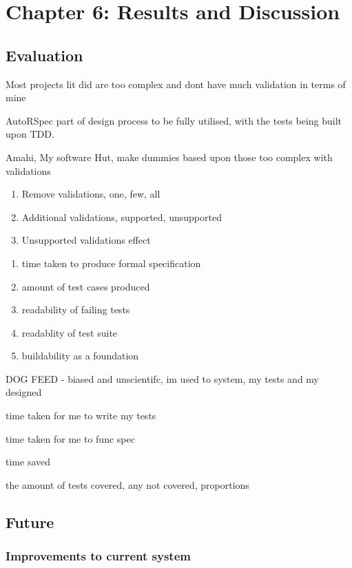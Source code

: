 \documentclass[a4paper,12pt]{article}
\begin{document}
\section{Chapter 6: Results and Discussion}

\subsection{Evaluation}
\par Most projects lit did are too complex and dont have much validation in terms of mine

\par AutoRSpec part of design process to be fully utilised, with the tests being built upon TDD. 

\par Amahi, My software Hut, make dummies based upon those too complex with validations

\begin{enumerate}
\item Remove validations, one, few, all
\item Additional validations, supported, unsupported
\item Unsupported validations effect
\end{enumerate}

\begin{enumerate}
\item time taken to produce formal specification
\item amount of test cases produced
\item readability of failing tests
\item readablity of test suite
\item buildability as a foundation
\end{enumerate}

\par DOG FEED - biased and unscientifc, im used to system, my tests and my designed
\par time taken for me to write my tests
\par time taken for me to func spec
\par time saved
\par the amount of tests covered, any not covered, proportions

\subsection{Future}

\subsubsection{Improvements to current system}
\end{document}
